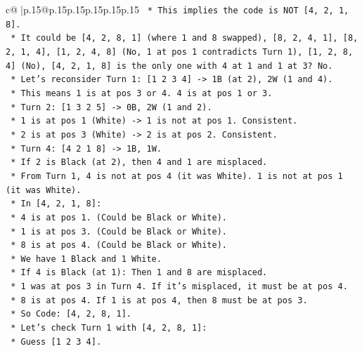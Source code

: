 \documentclass{article}
\begin{document}
{\begin{supertabular}{c@{$\;$}|p{.15\linewidth}@{}p{.15\linewidth}p{.15\linewidth}p{.15\linewidth}p{.15\linewidth}p{.15\linewidth}}
{{{\texttt{            *   This implies the code is NOT {[}4, 2, 1, 8{]}.} \\
\texttt{            *   It could be {[}4, 2, 8, 1{]} (where 1 and 8 swapped), {[}8, 2, 4, 1{]}, {[}8, 2, 1, 4{]}, {[}1, 2, 4, 8{]} (No, 1 at pos 1 contradicts Turn 1), {[}1, 2, 8, 4{]} (No), {[}4, 2, 1, 8{]} is the only one with 4 at 1 and 1 at 3? No.} \\
\texttt{            *   Let's reconsider Turn 1: {[}1 2 3 4{]} {-}> 1B (at 2), 2W (1 and 4).} \\
\texttt{                *   This means 1 is at pos 3 or 4. 4 is at pos 1 or 3.} \\
\texttt{            *   Turn 2: {[}1 3 2 5{]} {-}> 0B, 2W (1 and 2).} \\
\texttt{                *   1 is at pos 1 (White) {-}> 1 is not at pos 1. Consistent.} \\
\texttt{                *   2 is at pos 3 (White) {-}> 2 is at pos 2. Consistent.} \\
\texttt{            *   Turn 4: {[}4 2 1 8{]} {-}> 1B, 1W.} \\
\texttt{                *   If 2 is Black (at 2), then 4 and 1 are misplaced.} \\
\texttt{                *   From Turn 1, 4 is not at pos 4 (it was White). 1 is not at pos 1 (it was White).} \\
\texttt{                *   In {[}4, 2, 1, 8{]}:} \\
\texttt{                    *   4 is at pos 1. (Could be Black or White).} \\
\texttt{                    *   1 is at pos 3. (Could be Black or White).} \\
\texttt{                    *   8 is at pos 4. (Could be Black or White).} \\
\texttt{                *   We have 1 Black and 1 White.} \\
\texttt{                *   If 4 is Black (at 1): Then 1 and 8 are misplaced.} \\
\texttt{                    *   1 was at pos 3 in Turn 4. If it's misplaced, it must be at pos 4.} \\
\texttt{                    *   8 is at pos 4. If 1 is at pos 4, then 8 must be at pos 3.} \\
\texttt{                    *   So Code: {[}4, 2, 8, 1{]}.} \\
\texttt{                    *   Let's check Turn 1 with {[}4, 2, 8, 1{]}:} \\
\texttt{                        *   Guess {[}1 2 3 4{]}.} \\
}}}
\end{supertabular}}
\end{document}
